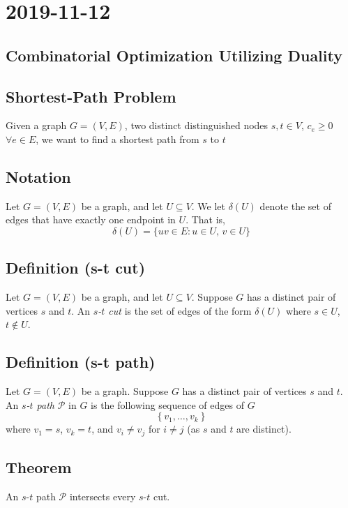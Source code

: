 \section{2019-11-12}
\subsection{Combinatorial Optimization Utilizing Duality}
\subsection{Shortest-Path Problem}
Given a graph $ G=(V,E) $, two distinct distinguished nodes $ s,t\in V $,
$ c_e\ge 0 $ $ \forall e\in E $, we want to find a shortest path from $s$ to $t$

\begin{defbox}
    \subsection{Notation}
    Let $ G=(V,E) $ be a graph, and let $ U\subseteq V $. We
    let $ \delta(U) $ denote the set of edges that have exactly
    one endpoint in $ U $. That is,
    \[ \delta(U)=\{uv\in E:u\in U,\,v\in U\} \]
\end{defbox}

\begin{defbox}
    \subsection{Definition (s-t cut)}
    Let $ G=(V,E) $ be a graph, and let $ U\subseteq V $.
    Suppose $ G $ has a distinct pair of vertices $ s $ and $ t $.
    An \emph{$s$-$t$ cut} is the set of edges of the form $ \delta(U) $
    where $ s\in U $, $ t\notin U $.
\end{defbox}

\begin{defbox}
    \subsection{Definition (s-t path)}
    Let $ G=(V,E) $ be a graph. Suppose $ G $ has a distinct pair of vertices $ s $ and $ t $.
    An \emph{$s$-$t$ path} $\mathcal{P}$ in $ G $ is the following sequence of edges of $G$
    \[ \left\{v_1,\ldots,v_{k}\right\} \]
    where $ v_1=s $, $ v_k=t $, and $ v_i\neq v_j $ for $ i\neq j $
    (as $ s $ and $ t $ are distinct).
\end{defbox}

\begin{thmbox}
    \subsection{Theorem}
    An $s$-$t$ path $ \mathcal{P} $ intersects every $s$-$t$ cut.
\end{thmbox}

